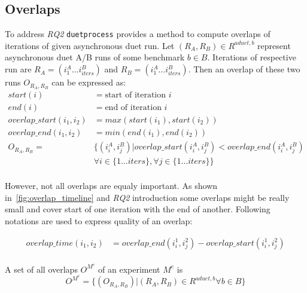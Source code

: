 \subsection{Overlaps}
\label{sec:overlaps}

To address \emph{RQ2} \lstinline{duetprocess} provides a method to compute overlaps of iterations of given asynchronous duet run.
Let $(R_A, R_B) \in R^{aduet, b}$ represent asynchronous duet A/B runs of some benchmark $b \in B$.
Iterations of respective run are $R_A = (i^A_1 \dots i^B_{iters})$ and $R_B = (i^A_1 \dots i^B_{iters})$.
Then an overlap of these two runs $O_{R_A, R_B}$ can be expressed as:
\begin{align*}
start(i) &= \text{start of iteration }i \\
end(i) &= \text{end of iteration } i \\
overlap\_start(i_1, i_2) &= max(start(i_1), start(i_2)) \\
overlap\_end(i_1, i_2) &= min(end(i_1), end(i_2)) \\
O_{R_A, R_B} =& \{(i^A_i, i^B_j) | overlap\_start(i^A_i, i^B_j) < overlap\_end(i^A_i, i^B_j) \\
              &\forall i \in \{1 \dots iters\}, \forall j \in \{1 \dots iters\}\} \\
\end{align*} 

However, not all overlaps are equaly important.
As shown in~\cref{fig:overlap_timeline} and \emph{RQ2} introduction some overlaps might be really small and cover start of one iteration with the end of another.
Following notations are used to express quality of an overlap:

\begin{align*}
overlap\_time(i_1, i_2) &= overlap\_end(i^1_i, i^2_j) - overlap\_start(i^1_i, i^2_j) \\
\end{align*}

A set of all overlaps $O^{M^e}$ of an experiment $M^e$ is
\[O^{M^e} = \{(O_{R_A, R_B}) | (R_A, R_B) \in R^{aduet, b} \forall b \in B \}\]
